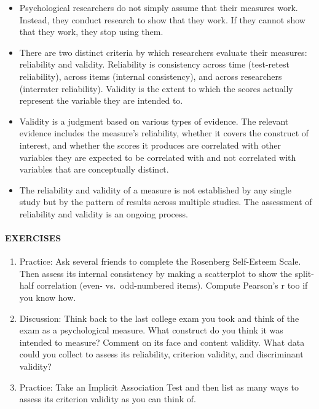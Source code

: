 \documentclass[
]{krantz}
\providecommand{\tightlist}{%
  \setlength{\itemsep}{0pt}\setlength{\parskip}{0pt}}
\begin{document}
\begin{itemize}
\tightlist
\item
  Psychological researchers do not simply assume that their measures work. Instead, they conduct research to show that they work. If they cannot show that they work, they stop using them.
\item
  There are two distinct criteria by which researchers evaluate their measures: reliability and validity. Reliability is consistency across time (test-retest reliability), across items (internal consistency), and across researchers (interrater reliability). Validity is the extent to which the scores actually represent the variable they are intended to.
\item
  Validity is a judgment based on various types of evidence. The relevant evidence includes the measure's reliability, whether it covers the construct of interest, and whether the scores it produces are correlated with other variables they are expected to be correlated with and not correlated with variables that are conceptually distinct.
\item
  The reliability and validity of a measure is not established by any single study but by the pattern of results across multiple studies. The assessment of reliability and validity is an ongoing process.
\end{itemize}

\paragraph*{EXERCISES}\label{exercises-9}

\begin{enumerate}
\def\labelenumi{\arabic{enumi}.}
\tightlist
\item
  Practice: Ask several friends to complete the Rosenberg Self-Esteem Scale. Then assess its internal consistency by making a scatterplot to show the split-half correlation (even- vs.~odd-numbered items). Compute Pearson's r too if you know how.
\item
  Discussion: Think back to the last college exam you took and think of the exam as a psychological measure. What construct do you think it was intended to measure? Comment on its face and content validity. What data could you collect to assess its reliability, criterion validity, and discriminant validity?
\item
  Practice: Take an Implicit Association Test and then list as many ways to assess its criterion validity as you can think of.
\end{enumerate}
\end{document}
